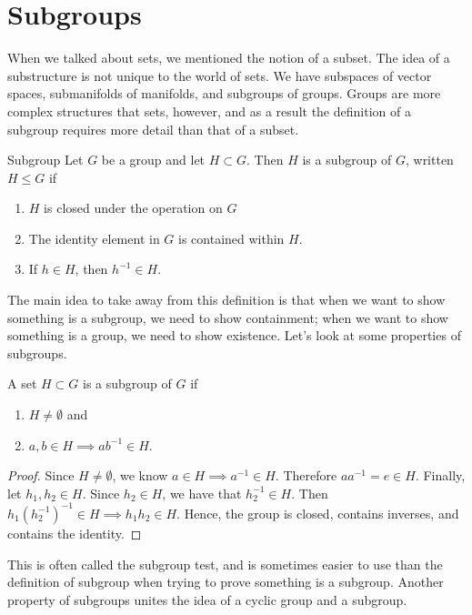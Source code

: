 \section{Subgroups}
When we talked about sets, we mentioned the notion of a subset. The idea of a substructure is not unique to the world of sets. We have subspaces of vector spaces, submanifolds of manifolds, and subgroups of groups. Groups are more complex structures that sets, however, and as a result the definition of a subgroup requires more detail than that of a subset.

\begin{definition}{Subgroup}
	Let $G$ be a group and let $H\subset G$. Then $H$ is a subgroup of $G$, written $H\leq G$ if
	\begin{enumerate}
		\item $H$ is closed under the operation on $G$
		\item The identity element in $G$ is contained within $H$.
		\item If $h\in H$, then $h^{-1}\in H$.
	\end{enumerate}
\end{definition}

The main idea to take away from this definition is that when we want to show something is a subgroup, we need to show containment; when we want to show something is a group, we need to show existence. Let's look at some properties of subgroups.

\begin{theorem}{}
	A set $H\subset G$ is a subgroup of $G$ if
	\begin{enumerate}
		\item $H\neq\emptyset$ and
		\item $a,b\in H\implies ab^{-1}\in H$.
	\end{enumerate}
\end{theorem}
\begin{proof}
	Since $H\neq\emptyset$, we know $a\in H\implies a^{-1}\in H$. Therefore $aa^{-1}=e\in H$. Finally, let $h_{1},h_{2}\in H$. Since $h_{2}\in H$, we have that $h_{2}^{-1}\in H$. Then $h_{1}(h_{2}^{-1})^{-1}\in H \implies h_{1}h_{2}\in H$.
	Hence, the group is closed, contains inverses, and contains the identity.
\end{proof}
This is often called the subgroup test, and is sometimes easier to use than the definition of subgroup when trying to prove something is a subgroup. Another property of subgroups unites the idea of a cyclic group and a subgroup.

